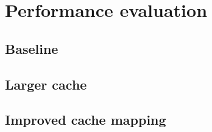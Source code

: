 \section{Performance evaluation}
\label{sec:performance}

\subsection{Baseline}

\subsection{Larger cache}

\subsection{Improved cache mapping}